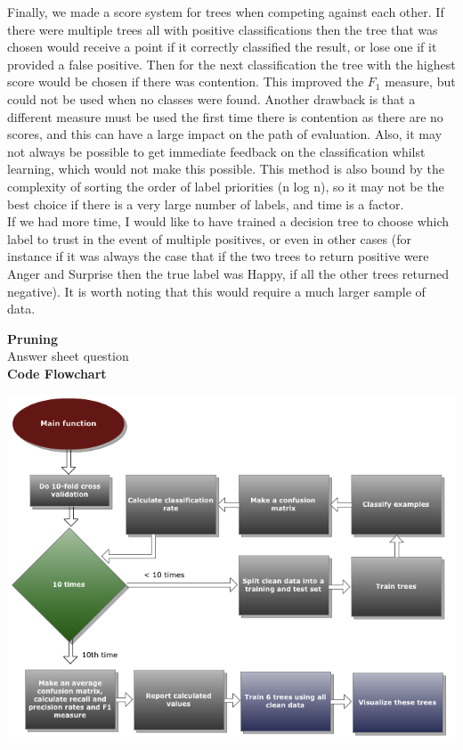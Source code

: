 \documentclass[12pt]{article}
\begin{document}
Finally, we made a score system for trees when competing against each other. If there were multiple trees all with positive classifications then the tree that was chosen would receive a point if it correctly classified the result, or lose one if it provided a false positive. Then for the next classification the tree with the highest score would be chosen if there was contention. This improved the \( F_1 \) measure, but could not be used when no classes were found. Another drawback is that a different measure must be used the first time there is contention as there are no scores, and this can have a large impact on the path of evaluation. Also, it may not always be possible to get immediate feedback on the classification whilst learning, which would not make this possible. This method is also bound by the complexity of sorting the order of label priorities (n log n), so it may not be the best choice if there is a very large number of labels, and time is a factor. \\

If we had more time, I would like to have trained a decision tree to choose which label to trust in the event of multiple positives, or even in other cases (for instance if it was always the case that if the two trees to return positive were Anger and Surprise then the true label was Happy, if all the other trees returned negative). It is worth noting that this would require a much larger sample of data.

{\bf Pruning} \\
Answer sheet question\\

{\bf Code Flowchart} \\
\begin{center}
  \includegraphics{report-images/flowchart.png}
\end{center}
\end{document}
